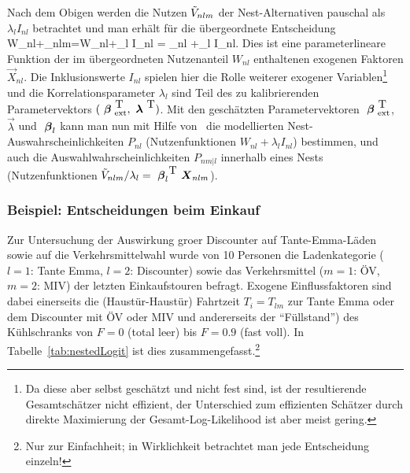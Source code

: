\item Nach dem Obigen werden die Nutzen
$\tilde{V}_{nlm}$ der Nest-Alternativen pauschal als $\lambda_lI_{nl}$
betrachtet und man erh\"alt f\"ur die \"ubergeordnete Entscheidung
\be
\label{Wnl}
W_{nl}+\tilV_{nlm}=W_{nl}+\lambda_l I_{nl}
 =\vecbeta\tr{} _{nl} +\lambda_l I_{nl}.
\ee
Dies ist eine parameterlineare Funktion der 
  im \"ubergeordneten Nutzenanteil $W_{nl}$ enthaltenen exogenen
  Faktoren $\vec{X}_{nl}$. Die Inklusionswerte $I_{nl}$ spielen 
  hier die Rolle weiterer exogener Variablen\footnote{Da
    diese aber selbst gesch\"atzt und nicht fest sind, ist der resultierende
    Gesamtsch\"atzer nicht effizient, der Unterschied zum effizienten
    Sch\"atzer durch direkte Maximierung der Gesamt-Log-Likelihood ist
    aber meist gering.} und die
  Korrelationsparameter $\lambda_l$ sind Teil des zu kalibrierenden
  Parametervektors $({\mbox{ \boldmath {$\beta$}}}^{{\mbox{ T}}}_{{\mbox{ {\scriptsize \hspace{-0.2ex}ext}}}}, {\mbox{ \boldmath {$\lambda$}}}^{{\mbox{ T}}})$. 
\ei
Mit den gesch\"atzten Parametervektoren ${\mbox{ \boldmath {$\beta$}}}^{{\mbox{ T}}}_{{\mbox{ {\scriptsize \hspace{-0.2ex}ext}}}}$,
$\vec{\lambda}$ und ${\mbox{ \boldmath {$\beta$}}}_{l}$ kann man nun mit Hilfe
von~ die modellierten Nest-Auswahrscheinlichkeiten
$P_{nl}$ (Nutzenfunktionen $W_{nl}+\lambda_l I_{nl}$) bestimmen, und
auch die Auswahlwahrscheinlichkeiten $P_{nm|l}$ innerhalb eines Nests
(Nutzenfunktionen $\tilde{V}_{nlm}/\lambda_l={\mbox{ \boldmath {$\beta$}}}_{l}^{{\mbox{ T}}}
{\mbox{ \boldmath {$X$}}}_{nlm}$).



\subsubsection{\label{sec:nestedLogit-beispiel}Beispiel: Entscheidungen
  beim Einkauf}

Zur Untersuchung der Auswirkung gro\3er Discounter 
 auf Tante-Emma-L\"aden sowie auf die
Verkehrsmittelwahl
wurde von 10 Personen die Ladenkategorie ($l=1$: Tante Emma, $l=2$:
Discounter) sowie das
Verkehrsmittel ($m=1$: \"OV, $m=2$: MIV) der letzten Einkaufstouren
befragt. Exogene Einflussfaktoren sind dabei einerseits die
(Haust\"ur-Haust\"ur) Fahrtzeit $T_i=T_{lm}$ zur Tante Emma oder dem
Discounter mit \"OV oder MIV und andererseits der ``F\"ullstand'') des
K\"uhlschranks von $F=0$ (total leer) bis $F=0.9$ (fast voll).
In Tabelle~\ref{tab:nestedLogit} ist dies
zusammengefasst.\footnote{Nur zur Einfachheit; in
  Wirklichkeit  
betrachtet man jede Entscheidung einzeln!} 

